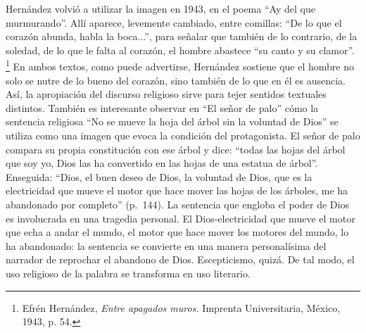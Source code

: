 \documentclass[14pt,twoside,final]{extbook} %
\let\oldfootnote\footnote
\renewcommand\footnote[1]{%
\oldfootnote{\hspace{1mm}#1}}
\begin{document}
Hernández volvió a utilizar la imagen en 1943, en el poema ``Ay del que murmurando''. Allí aparece, levemente cambiado, entre comillas: ``De lo que el corazón abunda, habla la boca...'', para señalar que también de lo contrario, de la soledad, de lo que le falta al corazón, el hombre abastece ``su canto y su clamor''.\footnote{Efrén Hernández, \emph{Entre apagados muros.} Imprenta Universitaria, México, 1943, p. 54.} En ambos textos, como puede advertirse, Hernández sostiene que el hombre no solo se nutre de lo bueno del corazón, sino también de lo que en él es ausencia. Así, la apropiación del discurso religioso sirve para tejer sentidos textuales distintos. También es interesante observar en ``El señor de palo'' cómo la sentencia religiosa ``No se mueve la hoja del árbol sin la voluntad de Dios'' se utiliza como una imagen que evoca la condición del protagonista. El señor de palo compara su propia constitución con ese árbol y dice: ``todas las hojas del árbol que soy yo, Dios las ha convertido en las hojas de una estatua de árbol''. Enseguida: ``Dios, el buen deseo de Dios, la voluntad de Dios, que es la electricidad que mueve el motor que hace mover las hojas de los árboles, me ha abandonado por completo'' (p.~144). La sentencia que engloba el poder de Dios es involucrada en una tragedia personal. El Dios-electricidad que mueve el motor que echa a andar el mundo, el motor que hace mover los motores del mundo, lo ha abandonado: la sentencia se convierte en una manera personalísima del narrador de reprochar el abandono de Dios. Escepticismo, quizá. De tal modo, el uso religioso de la palabra se transforma en uso literario.
\end{document}
